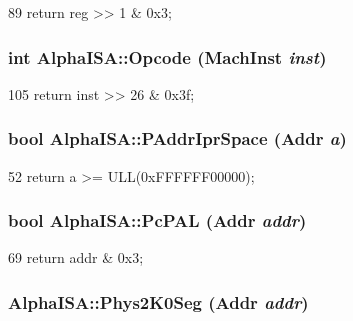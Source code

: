 \begin{DoxyCode}
89 { return reg >> 1 & 0x3; }
\end{DoxyCode}
\hypertarget{namespaceAlphaISA_a9a4cdce6243495f64ef6cc1c6912da10}{
\subsubsection[{Opcode}]{\setlength{\rightskip}{0pt plus 5cm}int AlphaISA::Opcode (MachInst {\em inst})}}
\label{namespaceAlphaISA_a9a4cdce6243495f64ef6cc1c6912da10}



\begin{DoxyCode}
105 { return inst >> 26 & 0x3f; }
\end{DoxyCode}
\hypertarget{namespaceAlphaISA_a85201164b9da471550f01069be9d1e7d}{
\subsubsection[{PAddrIprSpace}]{\setlength{\rightskip}{0pt plus 5cm}bool AlphaISA::PAddrIprSpace ({\bf Addr} {\em a})}}
\label{namespaceAlphaISA_a85201164b9da471550f01069be9d1e7d}



\begin{DoxyCode}
52 { return a >= ULL(0xFFFFFF00000); }
\end{DoxyCode}
\hypertarget{namespaceAlphaISA_a890ffda2717ffc0e2cd0e9f80b90fad2}{
\subsubsection[{PcPAL}]{\setlength{\rightskip}{0pt plus 5cm}bool AlphaISA::PcPAL ({\bf Addr} {\em addr})}}
\label{namespaceAlphaISA_a890ffda2717ffc0e2cd0e9f80b90fad2}



\begin{DoxyCode}
69 { return addr & 0x3; }
\end{DoxyCode}
\hypertarget{namespaceAlphaISA_a1305e32166e725ed6b030319f1ce8681}{
\subsubsection[{Phys2K0Seg}]{ AlphaISA::Phys2K0Seg ({\bf Addr} {\em addr})}}
\label{namespaceAlphaISA_a1305e32166e725ed6b030319f1ce8681}




